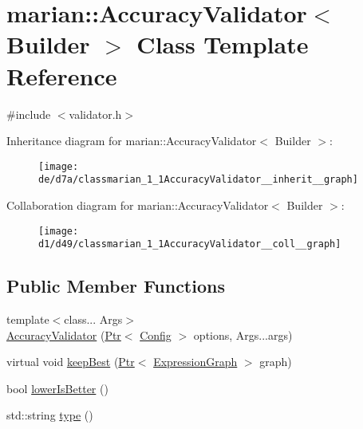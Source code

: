 \hypertarget{classmarian_1_1AccuracyValidator}{}\section{marian\+:\+:Accuracy\+Validator$<$ Builder $>$ Class Template Reference}
\label{classmarian_1_1AccuracyValidator}


{\ttfamily \#include $<$validator.\+h$>$}



Inheritance diagram for marian\+:\+:Accuracy\+Validator$<$ Builder $>$\+:
\nopagebreak
\begin{figure}[H]
\begin{center}
\leavevmode
\texttt{[image: de/d7a/classmarian\_1\_1AccuracyValidator\_\_inherit\_\_graph]}
\end{center}
\end{figure}


Collaboration diagram for marian\+:\+:Accuracy\+Validator$<$ Builder $>$\+:
\nopagebreak
\begin{figure}[H]
\begin{center}
\leavevmode
\texttt{[image: d1/d49/classmarian\_1\_1AccuracyValidator\_\_coll\_\_graph]}
\end{center}
\end{figure}
\subsection*{Public Member Functions}
\begin{DoxyCompactItemize}
\item 
{\footnotesize template$<$class... Args$>$ }\\\hyperlink{classmarian_1_1AccuracyValidator_a0b7a0fcb1137626593d5b063148591e5}{Accuracy\+Validator} (\hyperlink{namespacemarian_ad1a373be43a00ef9ce35666145137b08}{Ptr}$<$ \hyperlink{classmarian_1_1Config}{Config} $>$ options, Args...\+args)
\item 
virtual void \hyperlink{classmarian_1_1AccuracyValidator_a163ff7773c7cab8b92e83aaffdb50c4d}{keep\+Best} (\hyperlink{namespacemarian_ad1a373be43a00ef9ce35666145137b08}{Ptr}$<$ \hyperlink{classmarian_1_1ExpressionGraph}{Expression\+Graph} $>$ graph)
\item 
bool \hyperlink{classmarian_1_1AccuracyValidator_a4e4275b89312ca08185d5479bcbb74b0}{lower\+Is\+Better} ()
\item 
std\+::string \hyperlink{classmarian_1_1AccuracyValidator_ab941197460ea6175025ff32c4fff178c}{type} ()
\end{DoxyCompactItemize}
